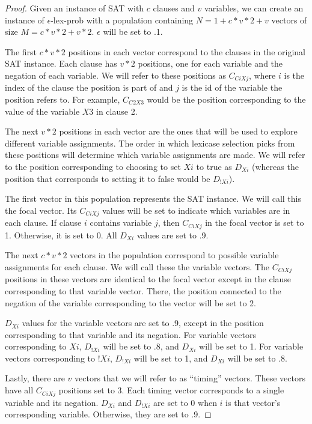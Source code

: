 \documentclass[sigconf]{acmart}
\begin{document}
\begin{proof}
Given an instance of {\sc SAT} with $c$ clauses and $v$ variables, we can create an instance of {\sc $\epsilon$-lex-prob} with a population containing $N = 1 + c*v*2 + v$ vectors of size $M = c*v*2 + v*2$. $\epsilon$ will be set to .1. 

The first $c*v*2$ positions in each vector correspond to the clauses in the original {\sc SAT} instance. Each clause has $v*2$ positions, one for each variable and the negation of each variable. We will refer to these positions as $C_{CiXj}$, where $i$ is the index of the clause the position is part of and $j$ is the id of the variable the position refers to. For example, $C_{C2X3}$ would be the position corresponding to the value of the variable $X3$ in clause 2.

The next $v*2$ positions in each vector are the ones that will be used to explore different variable assignments. The order in which lexicase selection picks from these positions will determine which variable assignments are made. We will refer to the position corresponding to choosing to set $Xi$ to true as $D_{Xi}$ (whereas the position that corresponds to setting it to false would be $D_{!Xi}$).

The first vector in this population represents the {\sc SAT} instance. We will call this the focal vector. Its $C_{CiXj}$ values will be set to indicate which variables are in each clause. If clause $i$ contains variable $j$, then $C_{CiXj}$ in the focal vector is set to 1. Otherwise, it is set to 0. All $D_{Xi}$ values are set to .9.

The next $c*v*2$ vectors in the population correspond to possible variable assignments for each clause. We will call these the variable vectors. The $C_{CiXj}$ positions in these vectors are identical to the focal vector except in the clause corresponding to that variable vector. There, the position connected to the negation of the variable corresponding to the vector will be set to 2.

$D_{Xi}$ values for the variable vectors are set to .9, except in the position corresponding to that variable and its negation. For variable vectors corresponding to $Xi$, $D_{!Xi}$ will be set to .8, and $D_{Xi}$ will be set to 1. For variable vectors corresponding to $!Xi$, $D_{!Xi}$ will be set to 1, and $D_{Xi}$ will be set to .8.

Lastly, there are $v$ vectors that we will refer to as ``timing'' vectors. These vectors have all $C_{CiXj}$ positions set to 3. Each timing vector corresponds to a single variable and its negation. $D_{Xi}$ and $D_{!Xi}$ are set to 0 when $i$ is that vector's corresponding variable. Otherwise, they are set to .9.


\end{proof}
\end{document}
